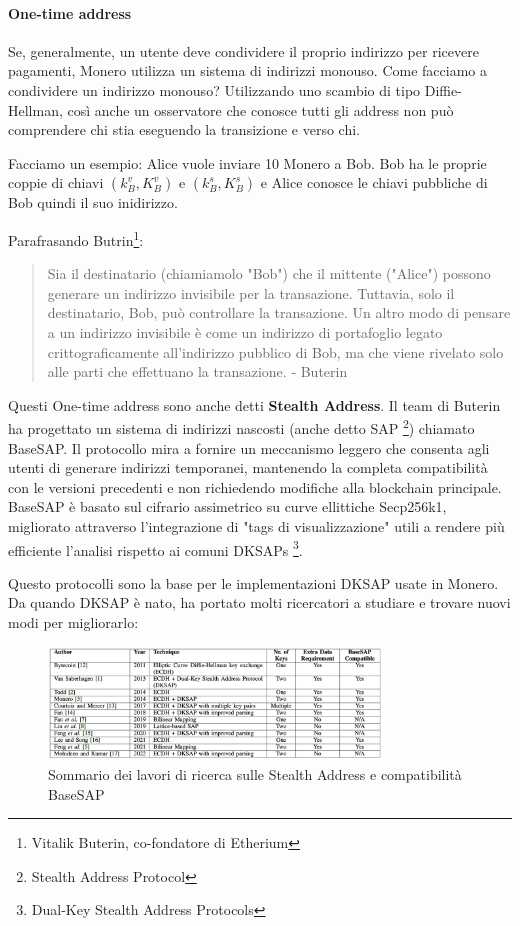 \documentclass[12pt,a4paper]{article}
\begin{document}
\paragraph{One-time address}
Se, generalmente, un utente deve condividere il proprio indirizzo per ricevere
pagamenti, Monero utilizza un sistema di indirizzi monouso. Come facciamo a
condividere un indirizzo monouso? Utilizzando uno scambio di tipo
Diffie-Hellman, così anche un osservatore che conosce tutti gli address non può
comprendere chi stia eseguendo la transizione e verso chi.

Facciamo un esempio: Alice vuole inviare 10 Monero a Bob. Bob ha le proprie
coppie di chiavi $(k^v_B, K^v_B)$ e $(k^s_B, K^s_B)$ e Alice conosce le chiavi
pubbliche di Bob quindi il suo inidirizzo.

Parafrasando Butrin\footnote{Vitalik Buterin, co-fondatore di Etherium}:
\begin{quote}
    Sia il destinatario (chiamiamolo "Bob") che il mittente ("Alice") possono
    generare un indirizzo invisibile per la transazione. Tuttavia, solo il
    destinatario, Bob, può controllare la transazione. Un altro modo di pensare
    a un indirizzo invisibile è come un indirizzo di portafoglio legato
    crittograficamente all’indirizzo pubblico di Bob, ma che viene rivelato solo
    alle parti che effettuano la transazione. - Buterin \cite{Buterin Quote}
\end{quote}

Questi One-time address sono anche detti \textbf{Stealth Address}. Il team di
Buterin ha progettato un sistema di indirizzi nascosti (anche detto SAP
\footnote{Stealth Address Protocol}) chiamato BaseSAP. Il protocollo mira a
fornire un meccanismo leggero che consenta agli utenti di generare indirizzi
temporanei, mantenendo la completa compatibilità con le versioni precedenti e
non richiedendo modifiche alla blockchain principale. BaseSAP è basato sul
cifrario assimetrico su curve ellittiche Secp256k1, migliorato attraverso
l'integrazione di "tags di visualizzazione" utili a rendere più efficiente
l'analisi rispetto ai comuni DKSAPs \footnote{Dual-Key Stealth Address
Protocols}.

Questo protocolli sono la base per le implementazioni DKSAP usate in Monero. Da
quando DKSAP è nato, ha portato molti ricercatori a studiare e trovare nuovi
modi per migliorarlo:

\begin{figure}[ht]
    \centering
    \includegraphics[width=0.79\textwidth]{./images/sommario.png}
    \caption{Sommario dei lavori di ricerca sulle Stealth Address e compatibilità BaseSAP}
    \label{fig:summary}
\end{figure}
\end{document}
